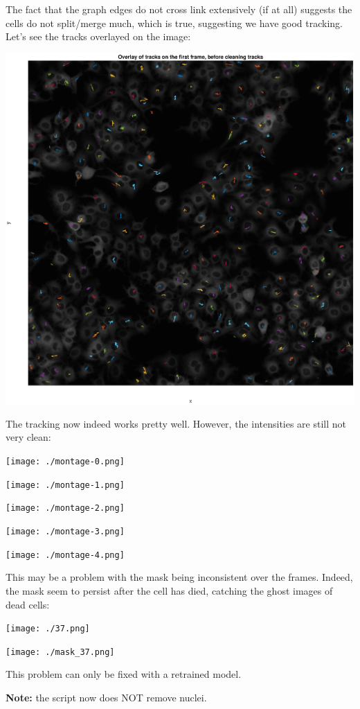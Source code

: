 \documentclass[11pt]{article}
\begin{document}
The fact that the graph edges do not cross link extensively (if at all) suggests the cells do not split/merge much, which is true, suggesting we have good tracking. Let's see the tracks overlayed on the image: 
\begin{center}
\includegraphics[width=.9\linewidth]{./overlay.eps}
\end{center}
The tracking now indeed works pretty well. However, the intensities are still not very clean:
\begin{center}
\texttt{[image: ./montage-0.png]}
\end{center}
\begin{center}
\texttt{[image: ./montage-1.png]}
\end{center}
\begin{center}
\texttt{[image: ./montage-2.png]}
\end{center}
\begin{center}
\texttt{[image: ./montage-3.png]}
\end{center}
\begin{center}
\texttt{[image: ./montage-4.png]}
\end{center}
This may be a problem with the mask being inconsistent over the frames. Indeed, the mask seem to persist after the cell has died, catching the ghost images of dead cells: 

\begin{center}
  \texttt{[image: ./37.png]}
\end{center}
\begin{center}
  \texttt{[image: ./mask\_37.png]}
  
\end{center}

This problem can only be fixed with a retrained model. 

\textbf{Note:} the script now does NOT remove nuclei. 
\end{document}
